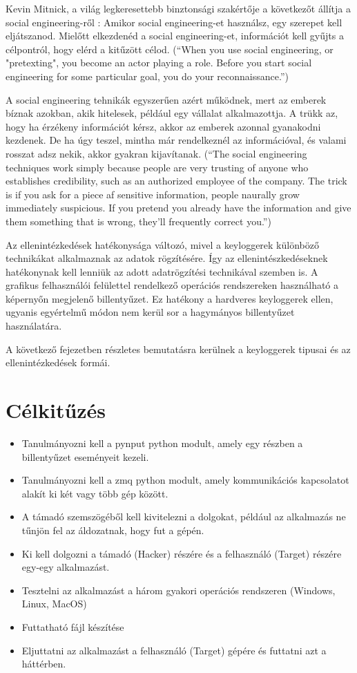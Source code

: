 \documentclass[12pt,a4paper,oneside]{report}
\begin{document}
Kevin Mitnick, a világ legkeresettebb binztonsági szakértője a következőt állítja a social engineering-ről \cite{ghostwires}: Amikor social engineering-et használsz, egy szerepet kell eljátszanod. Mielőtt elkezdenéd a social engineering-et, információt kell gyűjts a célpontról, hogy elérd a kitűzött célod. (``When you use social engineering, or "pretexting", you become an actor playing a role. Before you start social engineering for some particular goal, you do your reconnaissance.'')

A social engineering tehnikák egyszerűen azért működnek, mert az emberek bíznak azokban, akik hitelesek, például egy vállalat alkalmazottja. A trükk az, hogy ha érzékeny információt kérsz, akkor az emberek azonnal gyanakodni kezdenek. De ha úgy teszel, mintha már rendelkeznél az információval, és valami rosszat adsz nekik, akkor gyakran kijavítanak. (``The social engineering techniques work simply because people are very trusting of anyone who establishes credibility, such as an authorized employee of the company. The trick is if you ask for a piece af sensitive information, people naurally grow immediately suspicious. If you pretend you already have the information and give them something that is wrong, they'll frequently correct you.'')

Az ellenintézkedések hatékonysága változó, mivel a keyloggerek különböző technikákat alkalmaznak az adatok rögzítésére. Így az ellenintészkedéseknek hatékonynak kell lenniük az adott adatrögzítési technikával szemben is. A grafikus felhasználói felülettel rendelkező operációs rendszereken használható a képernyőn megjelenő billentyűzet. Ez hatékony a hardveres keyloggerek ellen, ugyanis egyértelmű módon nem kerül sor a hagymányos billentyűzet használatára.

A következő fejezetben részletes bemutatásra kerülnek a keyloggerek tipusai és az ellenintézkedések formái.

\section{Célkitűzés}
\begin{itemize}
\item Tanulmányozni kell a pynput python modult, amely egy részben a billentyűzet eseményeit kezeli.
\item Tanulmányozni kell a zmq python modult, amely kommunikációs kapcsolatot alakít ki két vagy több gép között.
\item A támadó szemszögéből kell kivitelezni a dolgokat, például az alkalmazás ne tűnjön fel az áldozatnak, hogy fut a gépén.
\item Ki kell dolgozni a támadó (Hacker) részére és a felhasználó (Target) részére egy-egy alkalmazást.
\item Tesztelni az alkalmazást a három gyakori operációs rendszeren (Windows, Linux, MacOS)
\item Futtatható fájl készítése
\item Eljuttatni az alkalmazást a felhasználó (Target) gépére és futtatni azt a háttérben.
\end{itemize}
\end{document}
